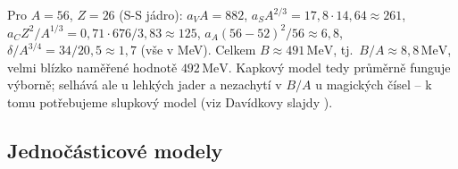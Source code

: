 \begin{vysvetleni}
Pro \(A=56\), \(Z=26\) (S-S jádro): \(a_VA = 882\), \(a_SA^{2/3} = 17{,}8\cdot
14{,}64 \approx 261\), \(a_CZ^2/A^{1/3} = 0{,}71\cdot676/3{,}83 \approx 125\),
\(a_A(56-52)^2/56\approx 6{,}8\), \(\delta/A^{3/4} = 34/20{,}5\approx1{,}7\)
(vše v MeV). Celkem \(B\approx 491\,\mathrm{MeV}\), tj.\ \(B/A\approx
8{,}8\,\mathrm{MeV}\), velmi blízko naměřené hodnotě \(492\,\mathrm{MeV}\).
Kapkový model tedy průměrně funguje výborně; selhává ale u lehkých jader
a nezachytí  v \(B/A\) u magických čísel -- k tomu potřebujeme
slupkový model (viz Davídkovy slajdy ).
\end{vysvetleni}

\subsection{Jednočásticové modely}

